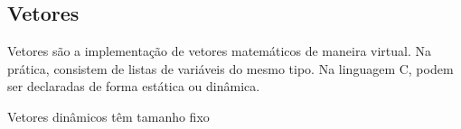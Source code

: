 
\subsection*{Vetores}

Vetores são a implementação de vetores matemáticos de maneira virtual. Na prática,
consistem de listas de variáveis do mesmo tipo. Na linguagem C, podem ser declaradas de
forma estática ou dinâmica.

Vetores dinâmicos têm tamanho fixo
